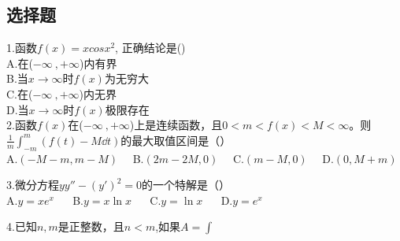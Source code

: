

\subsection{选择题}
1.函数$f(x)=xcosx^2$, 正确结论是()\\
A.在($-\infty~,+\infty$)内有界\\
B.当$x\to\infty$时$f(x)$为无穷大\\
C.在($-\infty~,+\infty$)内无界\\
D.当$x\to\infty$时$f(x)$极限存在\\

2.函数$f(x)$在($-\infty~,+\infty$)上是连续函数，且$0<m<f(x)<M<\infty$。则
$ \frac{1}{m} \int_{-m}^{m}(f(t)-M \dd{t})$的最大取值区间是（）\\
A.$(-M-m,m-M) \quad$ B.$ (2m-2M,0)\quad$  C.$(m-M,0)\quad$  D.$(0,M+m)$

3.微分方程$y y''-(y')^2=0$的一个特解是（）\\
A.$y=xe^x$ $\quad$ B.$y=x\ln x$ $\quad$ C.$y=\ln x$  $\quad$ D.$y=e^x$

4.已知$n,m$是正整数，且$n<m$,如果$A=\int_{}^{}$